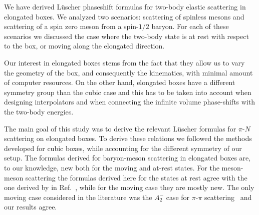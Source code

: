 \documentclass[aps,prd,reprint,showpacs,floatfix,longbibliography,,superscriptaddress]{revtex4-1}
\begin{document}
\begin{widetext}
We have derived  L\"{u}scher phaseshift formulas for two-body elastic scattering in
elongated boxes. We analyzed two scenarios: scattering of spinless mesons and
scattering of a spin zero meson from a spin-$1/2$ baryon. For each of these
scenarios we discussed the case where the two-body state is at rest with respect
to the box, or moving along the elongated direction.

Our interest in elongated boxes stems
from the fact that they allow us to vary the geometry of the box, and consequently
the kinematics, with minimal amount of computer resources. On the other hand,
elongated boxes have a different symmetry group than the cubic case and this
has to be taken into account when designing interpolators and when connecting
the infinite volume phase-shifts with the two-body energies. 

The main goal of this study was to derive the relevant L\"uscher formulas for
$\pi$-$N$ scattering on elongated boxes. 
To derive these relations we followed the methods developed for cubic boxes,
while accounting for the different symmetry of our setup. 
The formulas derived for baryon-meson scattering in elongated boxes are, to our
knowledge, new both for the moving and at-rest states. For the meson-meson
scattering the formulas derived here for the states at rest agree with the one derived by 
in Ref.~\cite{Feng:2004ua}, while for the moving case they are mostly 
new. The only moving case considered in the literature was the $A_2^-$ case for $\pi$-$\pi$
scattering~\cite{Guo:2016zos} and our results agree.


%
%
%


\end{widetext}
\end{document}
